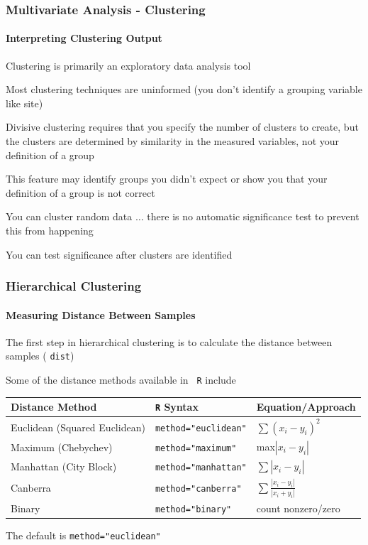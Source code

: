 \documentclass[10pt]{beamer}
\begin{document}
\begin{frame}
\frametitle{Multivariate Analysis - Clustering}
\framesubtitle{Interpreting Clustering Output}

\bi
\item Clustering is primarily an {\color{blue} exploratory} data analysis tool

\item Most clustering techniques are uninformed (you don't identify a grouping
  variable like site)

\bi
\item Divisive clustering requires that you specify the number of clusters to
  create, but the clusters are determined by similarity in the measured
  variables, not your definition of a group
\item This feature may identify groups you didn't expect or show you that
  your definition of a group is not correct
\ei

\item You can cluster random data $\ldots$ there is no automatic
significance test to prevent this from happening
	\bi
	\item You can test significance after clusters are identified
	\ei
\ei
\end{frame}


\begin{frame}
\frametitle{Hierarchical Clustering}
\framesubtitle{Measuring Distance Between Samples}

\bi
\item The first step in hierarchical clustering is to calculate
  the distance between samples ({\color{red} \tt dist})

\item Some of the distance methods available in {\tt \color{red} R} include

\vspace{2ex}
{\scriptsize
\begin{tabular}{lll}
Distance Method               & {\color{red} \tt R} Syntax           & Equation/Approach \\ \hline
Euclidean (Squared Euclidean) & {\color{red} \tt method="euclidean"} & $\sum{(x_{i} - y_{i})^{2}}$\\
Maximum (Chebychev)           & {\color{red} \tt method="maximum"}   & max$|x_{i} - y_{i}|$\\
Manhattan (City Block)        & {\color{red} \tt method="manhattan"} & $\sum{|x_{i} - y_{i}|}$\\
Canberra                      & {\color{red} \tt method="canberra"}  & $\sum{\frac{|x_{i} - y_{i}|}{|x_{i} + y_{i}|}}$\\
Binary                        & {\color{red} \tt method="binary"}    & count nonzero/zero \\ \hline
\end{tabular}
}

\vspace{2ex}
\item The default is {\color{red} \tt method="euclidean"}
\ei
\end{frame}
\end{document}
